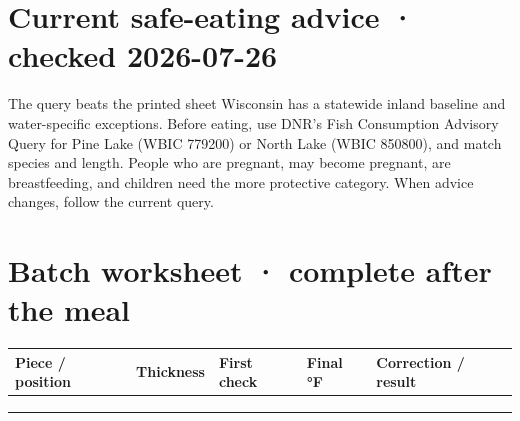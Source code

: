 \section{Current safe-eating advice · checked 2026-07-26}
\Advisory

\begin{center}
\end{center}

\begin{teloshazard}{The query beats the printed sheet}
Wisconsin has a statewide inland baseline and water-specific exceptions.
Before eating, use DNR's Fish Consumption Advisory Query for Pine Lake
(WBIC 779200) or North Lake (WBIC 850800), and match species and length. People
who are pregnant, may become pregnant, are breastfeeding, and children need
the more protective category. When advice changes, follow the current query.
\end{teloshazard}

\newpage
\section{Batch worksheet · complete after the meal}
\begin{center}
\end{center}

\begin{tabularx}{\linewidth}{@{}p{.20\linewidth}p{.15\linewidth}p{.17\linewidth}p{.16\linewidth}L@{}}
\toprule
\textbf{Piece / position}&\textbf{Thickness}&\textbf{First check}&
\textbf{Final °F}&\textbf{Correction / result}\\
\midrule
&&&&\\[.7em]
&&&&\\[.7em]
&&&&\\
\bottomrule
\end{tabularx}

